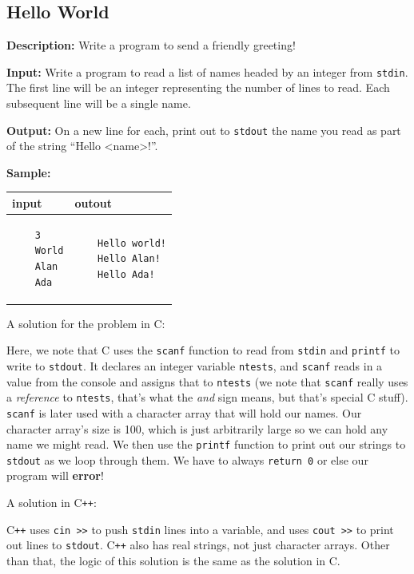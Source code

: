 \documentclass[a4paper]{article}
\begin{document}
\subsection{Hello World}
\textbf{Description:} Write a program to send a friendly greeting! 

\textbf{Input:} Write a program to read a list of names headed by an integer from \texttt{stdin}. The first line will be an integer representing the number of lines to read. Each subsequent line will be a single name.

\textbf{Output:} On a new line for each, print out to \texttt{stdout} the name you read as part of the string ``Hello \textless name\textgreater!''.

\textbf{Sample:}

\begin{tabular}{|p{}|p{}|}
    \hline
    \textbf{input} & \textbf{outout} \\
    \hline
    \begin{verbatim}
    3
    World
    Alan
    Ada
    \end{verbatim} &
    \begin{verbatim}
    Hello world!
    Hello Alan!
    Hello Ada!
    \end{verbatim} \\
    \hline
\end{tabular}
\newpage

A solution for the problem in C:


Here, we note that C uses the \texttt{scanf} function to read from \texttt{stdin} and \texttt{printf} to write to \texttt{stdout}. It declares an integer variable \texttt{ntests}, and \texttt{scanf} reads in a value from the console and assigns that to \texttt{ntests} (we note that \texttt{scanf} really uses a \textit{reference} to \texttt{ntests}, that's what the \textit{and} sign means, but that's special C stuff). \texttt{scanf} is later used with a character array that will hold our names. Our character array's size is 100, which is just arbitrarily large so we can hold any name we might read. We then use the \texttt{printf} function to print out our strings to \texttt{stdout} as we loop through them. We have to always \texttt{return 0} or else our program will \textbf{error}! 

A solution in C\texttt{++}:


C\texttt{++} uses \texttt{cin >>} to push \texttt{stdin} lines into a variable, and uses \texttt{cout >>} to print out lines to \texttt{stdout}. C\texttt{++} also has real strings, not just character arrays. Other than that, the logic of this solution is the same as the solution in C.
\end{document}

